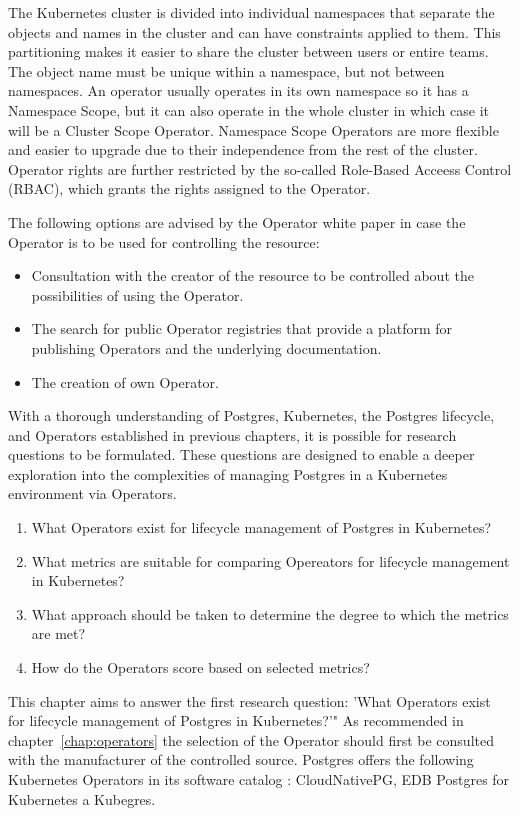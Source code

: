The Kubernetes cluster is divided into individual namespaces that separate the objects and names in the cluster and can have constraints applied to them. This partitioning makes it easier to share the cluster between users or entire teams. The object name must be unique within a namespace, but not between namespaces.  An operator usually operates in its own namespace so it has a Namespace Scope, but it can also operate in the whole cluster in which case it will be a Cluster Scope Operator. Namespace Scope Operators are more flexible and easier to upgrade due to their independence from the rest of the cluster. Operator rights are further restricted by the so-called Role-Based Acceess Control (RBAC), which grants the rights assigned to the Operator. \cite{ OperatorsAtK8sIface}

The following options are advised by the Operator white paper \cite{OperatorWhitepaper} in case the Operator is to be used for controlling the resource:
\begin{itemize}
  \item	Consultation with the creator of the resource to be controlled about the possibilities of using the Operator.
  \item	The search for public Operator registries that provide a platform for publishing Operators and the underlying documentation.
  \item	The creation of own Operator.
\end{itemize}

With a thorough understanding of Postgres, Kubernetes, the Postgres lifecycle, and Operators established in previous chapters, it is possible for research questions to be formulated. These questions are designed to enable a deeper exploration into the complexities of managing Postgres in a Kubernetes environment via Operators.

\begin{enumerate}
  \item What Operators exist for lifecycle management of Postgres in Kubernetes?
  \item What metrics are suitable for comparing Opereators for lifecycle management in Kubernetes?
  \item What approach should be taken to determine the degree to which the metrics are met?
  \item How do the Operators score based on selected metrics?
\end{enumerate}

This chapter aims to answer the first research question: 'What Operators exist for lifecycle management of Postgres in Kubernetes?'"
As recommended in chapter~\ref{chap:operators} the selection of the Operator should first be consulted with the manufacturer of the controlled source. Postgres offers the following Kubernetes Operators in its software catalog \cite{docuPgSwCatalogue}: CloudNativePG, EDB Postgres for Kubernetes a Kubegres.


